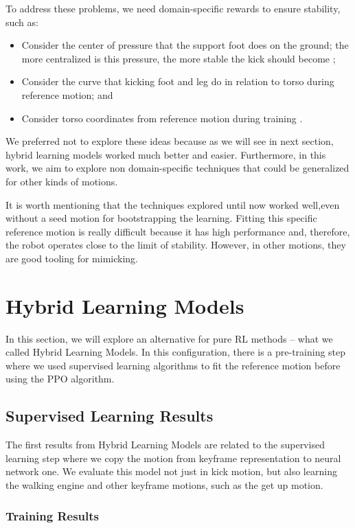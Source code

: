 To address these problems, we need domain-specific rewards to ensure stability, such as:

\begin{itemize}
	\item Consider the center of pressure that the support foot does on the ground; the more centralized is this pressure, the more stable the kick should become \cite{phdmanga};
	\item Consider the curve that kicking foot and leg do in relation to torso during reference motion; and
	\item Consider torso coordinates from reference motion during training \cite{peng2018}.
\end{itemize}

We preferred not to explore these ideas because as we will see in next section, hybrid learning models worked much better and easier. Furthermore, in this work, we aim to explore non domain-specific techniques that could be generalized for other kinds of motions.

It is worth mentioning that the techniques explored until now worked well,even without a seed motion for bootstrapping the learning. Fitting this specific reference motion is really difficult because it has high performance and, therefore, the robot operates close to the limit of stability. However, in other motions, they are good tooling for mimicking.

\section{Hybrid Learning Models}
In this section, we will explore an alternative for pure RL methods -- what we called Hybrid Learning Models. In this configuration, there is a pre-training step where we used supervised learning algorithms to fit the reference motion before using the PPO algorithm.

\subsection{Supervised Learning Results}\label{sec:slresults}
The first results from Hybrid Learning Models are related to the supervised learning step where we copy the motion from keyframe representation to neural network one. We evaluate this model not just in kick motion, but also learning the walking engine and other keyframe motions, such as the get up motion.

\subsubsection{Training Results}


